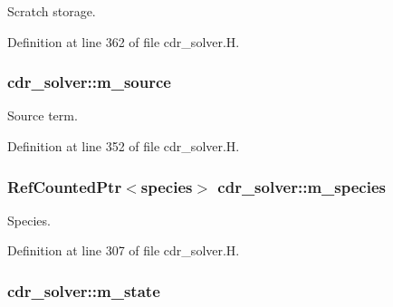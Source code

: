 Scratch storage. 



Definition at line 362 of file cdr\+\_\+solver.\+H.

\subsubsection[{\texorpdfstring{m\+\_\+source}{m_source}}]{ cdr\+\_\+solver\+::m\+\_\+source\hspace{0.3cm}{\ttfamily [protected]}}\hypertarget{classcdr__solver_a970e1cd699f3a9e47f4ba3eb3775bc8e}{}\label{classcdr__solver_a970e1cd699f3a9e47f4ba3eb3775bc8e}


Source term. 



Definition at line 352 of file cdr\+\_\+solver.\+H.

\subsubsection[{\texorpdfstring{m\+\_\+species}{m_species}}]{\setlength{\rightskip}{0pt plus 5cm}Ref\+Counted\+Ptr$<${\bf species}$>$ cdr\+\_\+solver\+::m\+\_\+species\hspace{0.3cm}{\ttfamily [protected]}}\hypertarget{classcdr__solver_ab340e99bc02a8f2ad3ef616077348e85}{}\label{classcdr__solver_ab340e99bc02a8f2ad3ef616077348e85}


Species. 



Definition at line 307 of file cdr\+\_\+solver.\+H.

\subsubsection[{\texorpdfstring{m\+\_\+state}{m_state}}]{ cdr\+\_\+solver\+::m\+\_\+state\hspace{0.3cm}{\ttfamily [protected]}}\hypertarget{classcdr__solver_a9cac7fee8e4da4e39079bfd9e04c8dd8}{}\label{classcdr__solver_a9cac7fee8e4da4e39079bfd9e04c8dd8}



